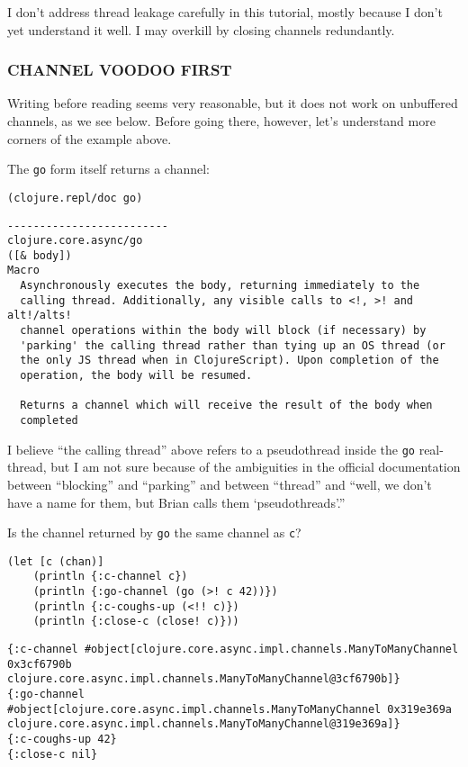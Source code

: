 \documentclass[10pt,oneside,x11names]{article}
\begin{document}
I don't address thread leakage carefully in this tutorial, mostly
because I don't yet understand it well. I may overkill by closing
channels redundantly.

\subsubsection{CHANNEL VOODOO FIRST}
\label{channel-voodoo-first}
Writing before reading seems very reasonable, but it does not work on
unbuffered channels, as we see below. Before going there, however, let's
understand more corners of the example above.

The \texttt{go} form itself returns a channel:

\begin{verbatim}
(clojure.repl/doc go)
\end{verbatim}

\begin{verbatim}
-------------------------
clojure.core.async/go
([& body])
Macro
  Asynchronously executes the body, returning immediately to the
  calling thread. Additionally, any visible calls to <!, >! and alt!/alts!
  channel operations within the body will block (if necessary) by
  'parking' the calling thread rather than tying up an OS thread (or
  the only JS thread when in ClojureScript). Upon completion of the
  operation, the body will be resumed.

  Returns a channel which will receive the result of the body when
  completed
\end{verbatim}

I believe ``the calling thread'' above refers to a pseudothread inside the
\texttt{go} real-thread, but I am not sure because of the ambiguities in the
official documentation between ``blocking'' and ``parking'' and between
``thread'' and ``well, we don't have a name for them, but Brian calls them
`pseudothreads'.''

Is the channel returned by \texttt{go} the same channel as \texttt{c}?

\begin{verbatim}
(let [c (chan)]
    (println {:c-channel c})
    (println {:go-channel (go (>! c 42))})
    (println {:c-coughs-up (<!! c)})
    (println {:close-c (close! c)}))
\end{verbatim}

\begin{verbatim}
{:c-channel #object[clojure.core.async.impl.channels.ManyToManyChannel 0x3cf6790b clojure.core.async.impl.channels.ManyToManyChannel@3cf6790b]}
{:go-channel #object[clojure.core.async.impl.channels.ManyToManyChannel 0x319e369a clojure.core.async.impl.channels.ManyToManyChannel@319e369a]}
{:c-coughs-up 42}
{:close-c nil}
\end{verbatim}
\end{document}
